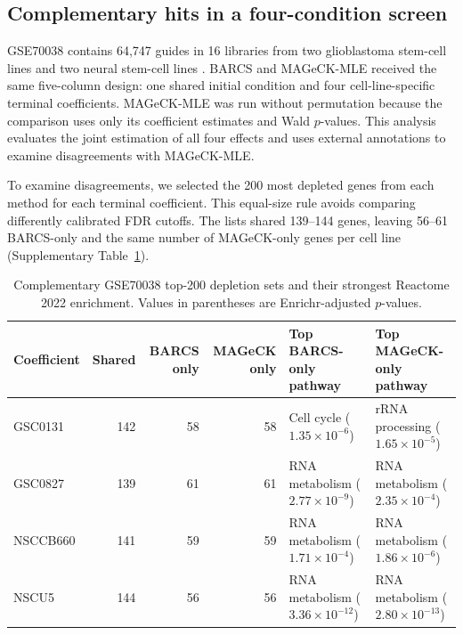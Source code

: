 \subsection{Complementary hits in a four-condition screen}
\label{sec:gse70038}

GSE70038 contains 64,747 guides in 16 libraries from two glioblastoma
stem-cell lines and two neural stem-cell lines \citep{toledo2015pkmyt1}. BARCS
and MAGeCK-MLE received the same five-column design: one shared initial
condition and four cell-line-specific terminal coefficients.  MAGeCK-MLE was
run without permutation because the comparison uses only its coefficient
estimates and Wald $p$-values.  This analysis
evaluates the joint estimation of all four effects and uses external
annotations to examine disagreements with MAGeCK-MLE.

To examine disagreements, we selected the 200 most depleted genes from each
method for each terminal coefficient.  This equal-size rule avoids comparing
differently calibrated FDR cutoffs.  The lists shared 139--144 genes, leaving
56--61 BARCS-only and the same number of MAGeCK-only genes per cell line
(Supplementary Table~\ref{tab:gse-enrichment}).

\begin{table}[htbp]
\centering
\caption{Complementary GSE70038 top-200 depletion sets and their strongest
Reactome 2022 enrichment.  Values in parentheses are Enrichr-adjusted
$p$-values.}
\label{tab:gse-enrichment}
\footnotesize
\setlength{\tabcolsep}{3pt}
\begin{tabular}{lrrr p{} p{}}
\toprule
Coefficient & Shared & BARCS only & MAGeCK only &
Top BARCS-only pathway & Top MAGeCK-only pathway\\
\midrule
GSC0131 & 142 & 58 & 58 &
Cell cycle ($1.35\times10^{-6}$) &
rRNA processing ($1.65\times10^{-5}$)\\
GSC0827 & 139 & 61 & 61 &
RNA metabolism ($2.77\times10^{-9}$) &
RNA metabolism ($2.35\times10^{-4}$)\\
NSCCB660 & 141 & 59 & 59 &
RNA metabolism ($1.71\times10^{-4}$) &
RNA metabolism ($1.86\times10^{-6}$)\\
NSCU5 & 144 & 56 & 56 &
RNA metabolism ($3.36\times10^{-12}$) &
RNA metabolism ($2.80\times10^{-13}$)\\
\bottomrule
\end{tabular}
\end{table}

